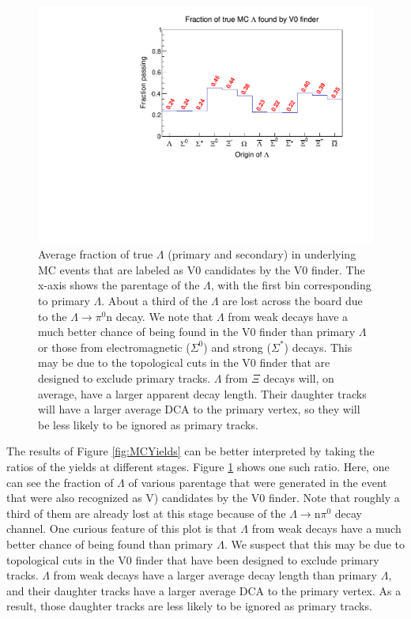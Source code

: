\begin{figure}[hbtp]
\includegraphics[width=36pc]{Figures/YieldAndEff/2016-08-10-FractionBeginToV0Finder.pdf}
\caption[V0 finder efficiency]{
Average fraction of true $\Lambda$ (primary and secondary) in underlying MC events that are labeled as V0 candidates by the V0 finder.
The x-axis shows the parentage of the $\Lambda$, with the first bin corresponding to primary $\Lambda$.
About a third of the $\Lambda$ are lost across the board due to the $\Lambda \rightarrow \pi^0 \mathrm{n}$ decay.
We note that $\Lambda$ from weak decays have a much better chance of being found in the V0 finder than primary $\Lambda$ or those from electromagnetic ($\Sigma^0$) and strong ($\Sigma^*$) decays.
This may be due to the topological cuts in the V0 finder that are designed to exclude primary tracks.
$\Lambda$ from $\Xi$ decays will, on average, have a larger apparent decay length.
Their daughter tracks will have a larger average DCA to the primary vertex, so they will be less likely to be ignored as primary tracks.
}
\label{fig:BeginToV0}
\end{figure}

The results of Figure \ref{fig:MCYields} can be better interpreted by taking the ratios of the yields at different stages.  
Figure \ref{fig:BeginToV0} shows one such ratio.
Here, one can see the fraction of $\Lambda$ of various parentage that were generated in the event that were also recognized as V) candidates by the V0 finder.
Note that roughly a third of them are already lost at this stage because of the $\Lambda \rightarrow \mathrm{n}\pi^0$ decay channel.
One curious feature of this plot is that $\Lambda$ from weak decays have a much better chance of being found than primary $\Lambda$.
We suspect that this may be due to topological cuts in the V0 finder that have been designed to exclude primary tracks.
$\Lambda$ from weak decays have a larger average decay length than primary $\Lambda$, and their daughter tracks have a larger average DCA to the primary vertex.
As a result, those daughter tracks are less likely to be ignored as primary tracks.

